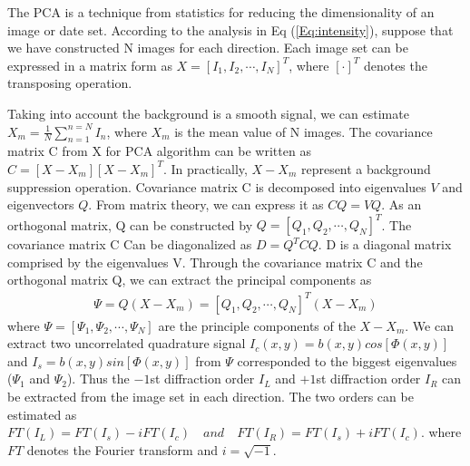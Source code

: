\documentclass[letterpaper,10pt]{article}
\begin{document}
The PCA is a technique from statistics for reducing the dimensionality of an image or date set\cite{Vargas2011}.
According to the analysis in Eq (\ref{Eq:intensity}), suppose that we have constructed N images for each direction.
Each image set can be expressed in a matrix form as $X = [I_1,I_2,\cdots,I_N]^{T}$, where $[\cdot]^T$ denotes the transposing operation.

Taking into account the background is a smooth signal, we can estimate $X_m = \frac{1}{N}\sum_{n=1}^{n=N}I_n$, where $X_m$ is the mean value of N images.
The covariance matrix C from X for PCA algorithm can be written as $C = [X - X_m][X-X_m]^T$.
In practically, $X-X_m$ represent a background suppression operation.
Covariance matrix C is decomposed into eigenvalues $V$ and eigenvectors $Q$.
From matrix theory, we can express it as $CQ = VQ$.
As an orthogonal matrix, Q can be constructed by $Q=[Q_1,Q_2,\cdots,Q_N]^T$.
The covariance matrix C Can be diagonalized as $D = Q^TCQ$.
D is a diagonal matrix comprised by the eigenvalues V.
Through the covariance matrix C and the orthogonal matrix Q, we can extract the principal components as
\begin{eqnarray}
\Psi = Q(X-X_m) = [Q_1,Q_2,\cdots,Q_N]^T(X-X_m) \label{Eq:Hotelling}
\end{eqnarray}
where $\Psi=[\Psi_1,\Psi_2,\cdots,\Psi_N]$ are the principle components of the $X-X_m$.
We can extract two uncorrelated quadrature signal $I_c(x,y) = b(x,y)cos[\Phi(x,y)]$ and $I_s = b(x,y)sin[\Phi(x,y)]$ from $\Psi$ corresponded to the biggest eigenvalues ($\Psi_1$ and $\Psi_2$).
Thus the $-1$st diffraction order $I_L$ and $+1$st diffraction order $I_R$ can be extracted from the image set in each direction.
The two orders can be estimated as $FT(I_L) = FT(I_s) - iFT(I_c) \quad and \quad FT(I_R) = FT(I_s) + iFT(I_c)$.
where $FT$ denotes the Fourier transform and $i = \sqrt{-1}$.
\end{document}
